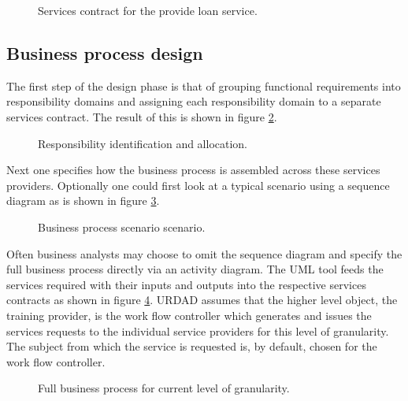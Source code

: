 \documentclass{IOS-Book-Article}
\begin{document}
\begin{figure}
  \centering
  \caption{Services contract for the provide loan service.}
  \label{fig:provideLoanContract}
\end{figure}


\subsection{Business process design}


The first step of the design phase is that of grouping functional requirements
into responsibility domains and assigning each responsibility domain to a
separate services contract. The result of this is shown in figure
\ref{fig:provideLoanResponsibilityAllocation}.

\begin{figure}
  \centering
  \caption{Responsibility identification and allocation.}
  \label{fig:provideLoanResponsibilityAllocation}
\end{figure}

Next one specifies how the business process is assembled across these services
providers. Optionally one could first look at a typical scenario using a
sequence diagram as is shown in figure
\ref{fig:provideLoanSuccessScenario}.


\begin{figure}
  \centering
  \caption{Business process scenario scenario.}
  \label{fig:provideLoanSuccessScenario}
\end{figure}

Often business analysts may choose to omit the sequence diagram and specify the
full business process directly via an activity diagram. The UML tool feeds the
services required with their inputs and outputs into the respective
services contracts as shown in figure \ref{fig:provideLoanBusinessProcess}.
URDAD assumes that the higher level object, the training
provider, is the work flow controller which generates and issues the services
requests to the individual service providers for this level of granularity. The
subject from which the service is requested is, by default, chosen for the work
flow controller.

\begin{figure}
  \centering
  \caption{Full business process for current level of granularity.}
  \label{fig:provideLoanBusinessProcess}
\end{figure}
\end{document}

